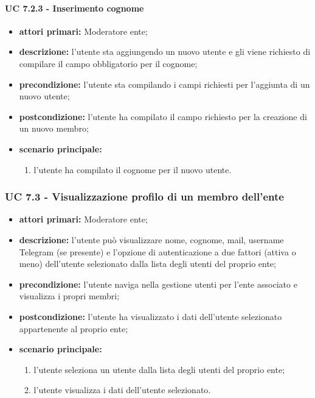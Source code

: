 			\paragraph{UC 7.2.3 - Inserimento cognome}
			\begin{itemize}
				\item \textbf{attori primari:} Moderatore ente;
				\item \textbf{descrizione:} l'utente sta aggiungendo un nuovo utente e gli viene richiesto di compilare il campo obbligatorio per il cognome;
				\item \textbf{precondizione:} l'utente sta compilando i campi richiesti per l'aggiunta di un nuovo utente;
				\item \textbf{postcondizione:} l'utente ha compilato il campo richiesto per la creazione di un nuovo membro;
				\item \textbf{scenario principale:}
				\begin{enumerate}
					\item{l'utente ha compilato il cognome per il nuovo utente.}
				\end{enumerate}	
			\end{itemize}

			\subsubsection{UC 7.3 - Visualizzazione profilo di un membro dell'ente}
			\begin{itemize}
				\item \textbf{attori primari:} Moderatore ente;
				\item \textbf{descrizione:} l'utente può visualizzare nome, cognome, mail, username Telegram (se presente) e l'opzione di autenticazione a due fattori (attiva o meno) dell'utente selezionato dalla lista degli utenti del proprio ente;
				\item \textbf{precondizione:} l'utente naviga nella gestione utenti per l'ente associato e visualizza i propri membri;
				\item \textbf{postcondizione:} l'utente ha visualizzato i dati dell'utente selezionato appartenente al proprio ente;
				\item \textbf{scenario principale:}
				\begin{enumerate}
					\item{l'utente seleziona un utente dalla lista degli utenti del proprio ente;}
					\item{l'utente visualizza i dati dell'utente selezionato.}
				\end{enumerate}
			\end{itemize}


